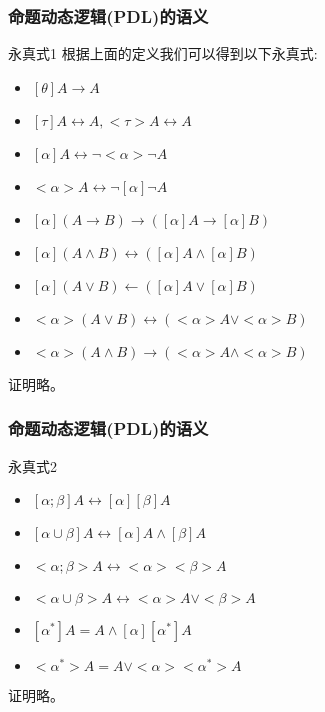 \documentclass{beamer}
\begin{document}
\begin{frame}
	\frametitle{命题动态逻辑(PDL)的语义}
	\begin{block}{永真式1}
		根据上面的定义我们可以得到以下永真式:
		\begin{itemize}
	    	\item $[\theta]A \rightarrow A$
	    	\item $[\tau]A \leftrightarrow A, <\tau>A \leftrightarrow A $
	    	\item $[\alpha]A \leftrightarrow \neg <\alpha> \neg A $
	    	\item $<\alpha>A \leftrightarrow \neg [\alpha] \neg A $
	    	\item $[\alpha](A \rightarrow B) \rightarrow ([\alpha]A \rightarrow [\alpha]B)  $
	    	\item $[\alpha](A \wedge B) \leftrightarrow ([\alpha]A \wedge [\alpha]B)  $
	    	\item $[\alpha](A \vee B) \leftarrow ([\alpha]A \vee [\alpha]B)  $
	    	\item $<\alpha>(A \vee B) \leftrightarrow (<\alpha>A \vee <\alpha>B)  $
	    	\item $<\alpha>(A \wedge B) \rightarrow (<\alpha>A \wedge <\alpha>B)  $
		\end{itemize}
		证明略。
	\end{block}
\end{frame}


\begin{frame}
	\frametitle{命题动态逻辑(PDL)的语义}
	\begin{block}{永真式2}
		\begin{itemize}
			\item $[\alpha ;\beta]A \leftrightarrow [\alpha][\beta]A $
			\item $[\alpha \cup \beta]A \leftrightarrow [\alpha]A \wedge [\beta]A $
			\item $<\alpha ;\beta>A \leftrightarrow <\alpha><\beta>A $
			\item $<\alpha \cup \beta>A \leftrightarrow <\alpha>A \vee <\beta>A $
			\item $[\alpha^{*}]A = A \wedge [\alpha][\alpha^{*}]A $
			\item $<\alpha^{*}>A = A \vee <\alpha><\alpha^{*}>A $
		\end{itemize}
		证明略。
	\end{block}
\end{frame}





\end{document}
